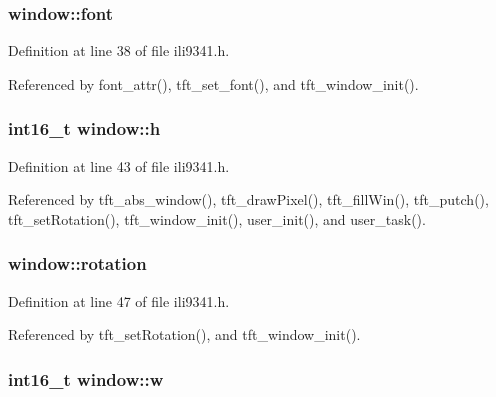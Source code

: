 \hypertarget{structwindow_acee24e56db43557a46cbb5ca3fe35021}{
\subsubsection[{font}]{ window\-::font}}\label{structwindow_acee24e56db43557a46cbb5ca3fe35021}


Definition at line 38 of file ili9341.\-h.



Referenced by font\-\_\-attr(), tft\-\_\-set\-\_\-font(), and tft\-\_\-window\-\_\-init().

\hypertarget{structwindow_a822391abd5d09e6ce7152f68cff3ef2b}{
\subsubsection[{h}]{\setlength{\rightskip}{0pt plus 5cm}int16\-\_\-t window\-::h}}\label{structwindow_a822391abd5d09e6ce7152f68cff3ef2b}


Definition at line 43 of file ili9341.\-h.



Referenced by tft\-\_\-abs\-\_\-window(), tft\-\_\-draw\-Pixel(), tft\-\_\-fill\-Win(), tft\-\_\-putch(), tft\-\_\-set\-Rotation(), tft\-\_\-window\-\_\-init(), user\-\_\-init(), and user\-\_\-task().

\hypertarget{structwindow_afbd48ebcb41e68d0f458dac593578aa8}{
\subsubsection[{rotation}]{ window\-::rotation}}\label{structwindow_afbd48ebcb41e68d0f458dac593578aa8}


Definition at line 47 of file ili9341.\-h.



Referenced by tft\-\_\-set\-Rotation(), and tft\-\_\-window\-\_\-init().

\hypertarget{structwindow_ad89fdeb11ce94e2e7501f7290372d6ae}{
\subsubsection[{w}]{\setlength{\rightskip}{0pt plus 5cm}int16\-\_\-t window\-::w}}\label{structwindow_ad89fdeb11ce94e2e7501f7290372d6ae}


